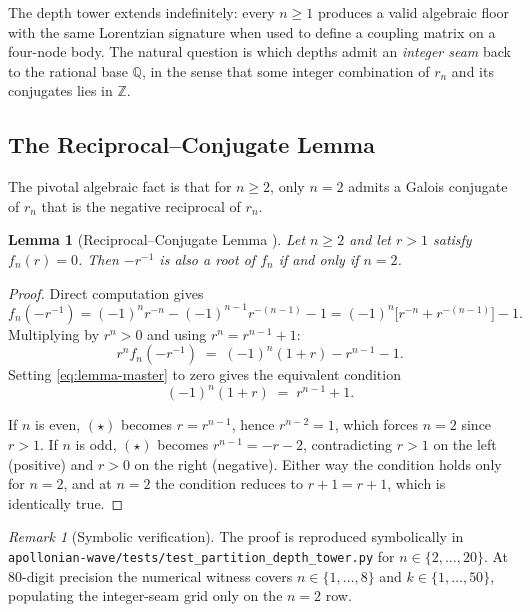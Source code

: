 \documentclass[11pt,a4paper]{article}
\theoremstyle{plain}
\newtheorem{lemma}[theorem]{Lemma}
\theoremstyle{definition}
\theoremstyle{remark}
\newtheorem{remark}[theorem]{Remark}
\numberwithin{equation}{section}
\providecommand{\Z}{\mathbb{Z}}
\providecommand{\Q}{\mathbb{Q}}
\begin{document}
The depth tower extends indefinitely: every $n \ge 1$ produces a
valid algebraic floor with the same Lorentzian signature when used
to define a coupling matrix on a four-node body.  The natural
question is which depths admit an \emph{integer seam} back to the
rational base $\Q$, in the sense that some integer combination of
$r_n$ and its conjugates lies in $\Z$.

\subsection{The Reciprocal--Conjugate Lemma}

The pivotal algebraic fact is that for $n \ge 2$, only $n = 2$
admits a Galois conjugate of $r_n$ that is the negative reciprocal
of $r_n$.

\begin{lemma}[Reciprocal--Conjugate Lemma {\cite[Lem.~2.2]{two-floor}}]
\label{lem:reciprocal-conjugate}
Let $n \ge 2$ and let $r > 1$ satisfy $f_n(r) = 0$.  Then $-r^{-1}$
is also a root of $f_n$ if and only if $n = 2$.
\end{lemma}

\begin{proof}
Direct computation gives
\[
f_n(-r^{-1})
 = (-1)^n r^{-n} - (-1)^{n-1} r^{-(n-1)} - 1
 = (-1)^n \bigl[r^{-n} + r^{-(n-1)}\bigr] - 1.
\]
Multiplying by $r^n > 0$ and using $r^n = r^{n-1} + 1$:
\begin{equation}
  r^n f_n(-r^{-1}) \;=\; (-1)^n (1 + r) - r^{n-1} - 1.
  \label{eq:lemma-master}
\end{equation}
Setting \eqref{eq:lemma-master} to zero gives the equivalent
condition
\begin{equation}
  (-1)^n (1+r) \;=\; r^{n-1} + 1. \tag{$\star$}
  \label{eq:star}
\end{equation}

If $n$ is even, $(\star)$ becomes $r = r^{n-1}$, hence $r^{n-2} = 1$,
which forces $n = 2$ since $r > 1$.  If $n$ is odd, $(\star)$
becomes $r^{n-1} = -r - 2$, contradicting $r > 1$ on the left
(positive) and $r > 0$ on the right (negative).  Either way the
condition holds only for $n = 2$, and at $n = 2$ the condition
reduces to $r + 1 = r + 1$, which is identically true.
\end{proof}

\begin{remark}[Symbolic verification]
\label{rmk:symbolic}
The proof is reproduced symbolically in
\texttt{apollonian-wave/tests/test\_partition\_depth\_tower.py}
for $n \in \{2, \ldots, 20\}$.  At $80$-digit precision the
numerical witness covers $n \in \{1, \ldots, 8\}$ and $k \in
\{1, \ldots, 50\}$, populating the integer-seam grid only on the
$n = 2$ row.
\end{remark}
\end{document}
